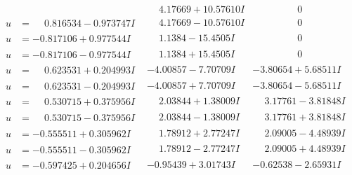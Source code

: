 \documentclass[1p]{elsarticle_modified}
\theoremstyle{definition}
\begin{document}
$$\begin{array}{c|c|c}
 & \phantom{-}4.17669 + 10.57610 I & \phantom{-0.000000 } 0 \\ \hline\begin{aligned}
u &= \phantom{-}0.816534 - 0.973747 I\end{aligned}
 & \phantom{-}4.17669 - 10.57610 I & \phantom{-0.000000 } 0 \\ \hline\begin{aligned}
u &= -0.817106 + 0.977544 I\end{aligned}
 & \phantom{-}1.1384 - 15.4505 I & \phantom{-0.000000 } 0 \\ \hline\begin{aligned}
u &= -0.817106 - 0.977544 I\end{aligned}
 & \phantom{-}1.1384 + 15.4505 I & \phantom{-0.000000 } 0 \\ \hline\begin{aligned}
u &= \phantom{-}0.623531 + 0.204993 I\end{aligned}
 & -4.00857 - 7.70709 I & -3.80654 + 5.68511 I \\ \hline\begin{aligned}
u &= \phantom{-}0.623531 - 0.204993 I\end{aligned}
 & -4.00857 + 7.70709 I & -3.80654 - 5.68511 I \\ \hline\begin{aligned}
u &= \phantom{-}0.530715 + 0.375956 I\end{aligned}
 & \phantom{-}2.03844 + 1.38009 I & \phantom{-}3.17761 - 3.81848 I \\ \hline\begin{aligned}
u &= \phantom{-}0.530715 - 0.375956 I\end{aligned}
 & \phantom{-}2.03844 - 1.38009 I & \phantom{-}3.17761 + 3.81848 I \\ \hline\begin{aligned}
u &= -0.555511 + 0.305962 I\end{aligned}
 & \phantom{-}1.78912 + 2.77247 I & \phantom{-}2.09005 - 4.48939 I \\ \hline\begin{aligned}
u &= -0.555511 - 0.305962 I\end{aligned}
 & \phantom{-}1.78912 - 2.77247 I & \phantom{-}2.09005 + 4.48939 I \\ \hline\begin{aligned}
u &= -0.597425 + 0.204656 I\end{aligned}
 & -0.95439 + 3.01743 I & -0.62538 - 2.65931 I \\ \hline\begin{aligned}

\end{aligned}
\end{array}$$
\end{document}
